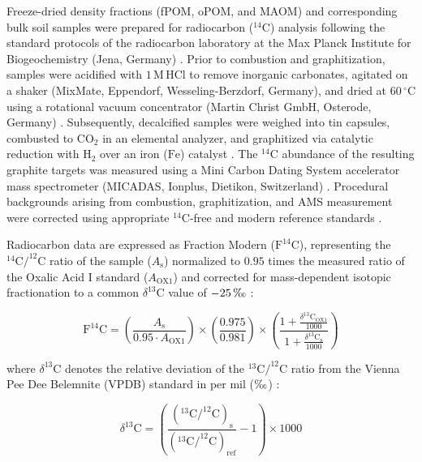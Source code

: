\documentclass[preprint,12pt]{elsarticle}
\begin{document}
Freeze-dried density fractions (fPOM, oPOM, and MAOM) and corresponding bulk soil samples were prepared for radiocarbon ($^{14}\text{C}$) analysis following the standard protocols of the radiocarbon laboratory at the Max Planck Institute for Biogeochemistry (Jena, Germany) \citep{Steinhof2017}. Prior to combustion and graphitization, samples were acidified with $1\,\text{M}\,\text{HCl}$ to remove inorganic carbonates, agitated on a shaker (MixMate, Eppendorf, Wesseling-Berzdorf, Germany), and dried at $60\,^{\circ}\text{C}$ using a rotational vacuum concentrator (Martin Christ GmbH, Osterode, Germany) \citep{Steinhof2017}. Subsequently, decalcified samples were weighed into tin capsules, combusted to $\text{CO}_2$ in an elemental analyzer, and graphitized via catalytic reduction with $\text{H}_2$ over an iron ($\text{Fe}$) catalyst \citep{Steinhof2017}. The $^{14}\text{C}$ abundance of the resulting graphite targets was measured using a Mini Carbon Dating System accelerator mass spectrometer (MICADAS, Ionplus, Dietikon, Switzerland) \citep{Steinhof2017}. Procedural backgrounds arising from combustion, graphitization, and AMS measurement were corrected using appropriate $^{14}\text{C}$-free and modern reference standards \citep{Steinhof2017}.

Radiocarbon data are expressed as Fraction Modern ($\text{F}^{14}\text{C}$), representing the $^{14}\text{C}/^{12}\text{C}$ ratio of the sample ($A_{\text{s}}$) normalized to $0.95$ times the measured ratio of the Oxalic Acid I standard ($A_{\text{OX1}}$) and corrected for mass-dependent isotopic fractionation to a common $\delta^{13}\text{C}$ value of $-25\,\text{\textperthousand}$ \citep{Stuiver1977, Trumbore2009}:

\begin{equation}
\text{F}^{14}\text{C} = \left( \frac{A_{\text{s}}}{0.95 \cdot A_{\text{OX1}}} \right) \times \left( \frac{0.975}{0.981} \right) \times \left( \frac{1 + \frac{\delta^{13}\text{C}_{\text{OX1}}}{1000}}{1 + \frac{\delta^{13}\text{C}_{\text{s}}}{1000}} \right)
\end{equation}

where $\delta^{13}\text{C}$ denotes the relative deviation of the $^{13}\text{C}/^{12}\text{C}$ ratio from the Vienna Pee Dee Belemnite (VPDB) standard in per mil ($\text{\textperthousand}$) \citep{Stuiver1977}:

\begin{equation}
\delta^{13}\text{C} = \left( \frac{\left(^{13}\text{C}/^{12}\text{C}\right)_{\text{s}}}{\left(^{13}\text{C}/^{12}\text{C}\right)_{\text{ref}}} - 1 \right) \times 1000
\end{equation}
\end{document}
